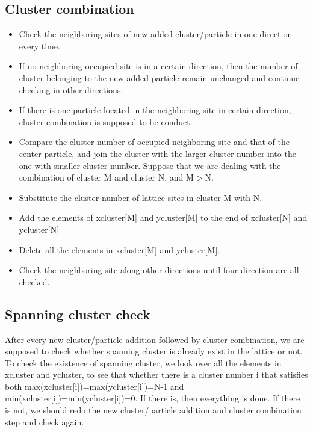 \documentclass[11pt, oneside]{article}   	%
\begin{document}
\subsection{Cluster combination}
\begin{itemize}
\item Check the neighboring sites of new added cluster/particle in one direction every time.
\item If no neighboring occupied site is in a certain direction, then the number of cluster belonging to the new added particle remain unchanged and continue checking in other directions.
\item If there is one particle located in the neighboring site in certain direction, cluster combination is supposed to be conduct.
\item Compare the cluster number of occupied neighboring site and that of the center particle, and join the cluster with the larger cluster number into the one with smaller cluster number. Suppose that we are dealing with the combination of cluster M and cluster N, and M$>$N.
\item Substitute the cluster number of lattice sites in cluster M with N.  
\item Add the elements of xcluster[M] and ycluster[M] to the end of xcluster[N] and ycluster[N]
\item Delete all the elements in xcluster[M] and ycluster[M].
\item Check the neighboring site along other directions until four direction are all checked.
\end{itemize}

\subsection{Spanning cluster check}
After every new cluster/particle addition followed by cluster combination, we are supposed to check whether spanning cluster is already exist in the lattice or not. To check the existence of spanning cluster, we look over all the elements in xcluster and ycluster, to see that whether there is a cluster number i that satisfies both max(xcluster[i])=max(ycluster[i])=N-1 and min(xcluster[i])=min(ycluster[i])=0. If there is, then everything is done. If there is not, we should redo the new cluster/particle addition and cluster combination step and check again.
\end{document}
